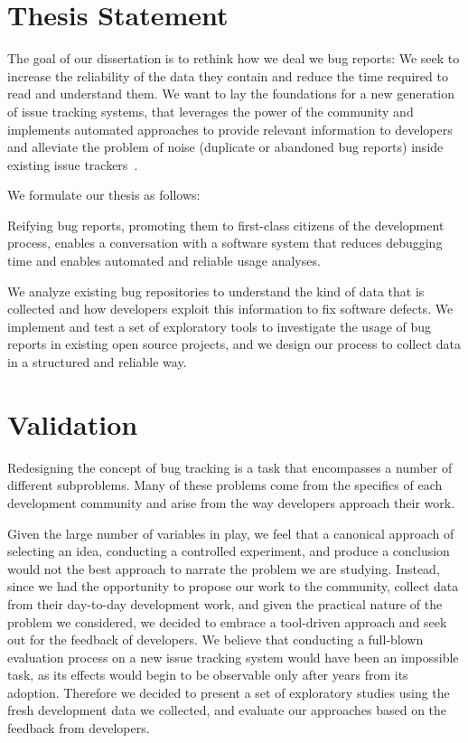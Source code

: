 

\section{Thesis Statement}\label{sec:thesis}

The goal of our dissertation is to rethink how we deal we bug reports: We seek to increase the reliability of the data they contain and reduce the time required to read and understand them. We want to lay the foundations for a new generation of issue tracking systems, that leverages the power of the community and implements automated approaches to provide relevant information to developers~\cite{Zimm2010a} and alleviate the problem of noise (\ie duplicate or abandoned bug reports) inside existing issue trackers~\cite{Wang2008a}.

\filbreak

We formulate our thesis as follows:

\begin{framed}
Reifying bug reports, promoting them to first-class citizens of the development process, enables a conversation with a software system that reduces debugging time and enables automated and reliable usage analyses.
\end{framed}


We analyze existing bug repositories to understand the kind of data that is collected and how developers exploit this information to fix software defects.
We implement and test a set of exploratory tools to investigate the usage of bug reports in existing open source projects, and we design our process to collect data in a structured and reliable way.


\section{Validation}

Redesigning the concept of bug tracking is a task that encompasses a number of different subproblems.
Many of these problems come from the specifics of each development community and arise from the way developers approach their work.

Given the large number of variables in play, we feel that a canonical approach of selecting an idea, conducting a controlled experiment, and produce a conclusion would not the best approach to narrate the problem we are studying.
Instead, since we had the opportunity to propose our work to the \pha community, collect data from their day-to-day development work, and given the practical nature of the problem we considered, we decided to embrace a tool-driven approach and seek out for the feedback of developers.
We believe that conducting a full-blown evaluation process on a new issue tracking system would have been an impossible task, as its effects would begin to be observable only after years from its adoption.
Therefore we decided to present a set of exploratory studies using the fresh development data we collected, and evaluate our approaches based on the feedback from developers.


